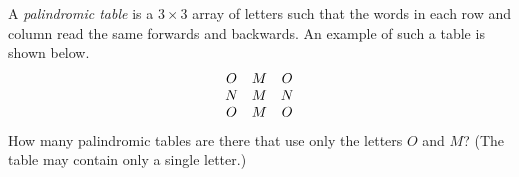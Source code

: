 A \emph{palindromic table} is a $3 \times 3$ array of letters such that the words in each row and column read the same forwards and backwards. An example of such a table is shown below. 
\[ \begin{array}[h]{ccc}
	O & M & O \\
	N & M & N \\
	O & M & O
\end{array} \]
How many palindromic tables are there that use only the letters $O$ and $M$?  (The table may contain only a single letter.)
